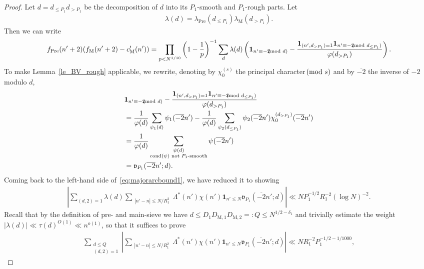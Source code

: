 \documentclass[12pt]{amsart}
\theoremstyle{definition}
\theoremstyle{remark}
\numberwithin{equation}{section}
\newcommand{\1}{\mathbf{1}}
\let\oldpmod\pmod
\renewcommand{\pmod}[1]{\hspace{-0.12cm}\oldpmod {#1}}
\begin{document}
\begin{proof}
  Let $d= d_{\le P_1}d_{>P_1}$ be the decomposition of $d$ into its $P_1$-smooth and $P_1$-rough parts. Let
  \begin{align*}
    \lambda(d)=\lambda_{\mathrm{Pre}}(d_{\leq P_1})\lambda_{\mathrm{M}}(d_{>P_1}).
  \end{align*}
Then we can write
  \begin{align*}
      f_{\mathrm{{Pre}}}(n'+2)(f_{\mathrm{{M}}}(n'+2)-c'_{\textup{M}}(n'))=\prod_{p<N^{1/10}}\left(1-\frac{1}{p}\right)^{-1}\sum_{d}\lambda(d)\left(\1_{n'\equiv -2\pmod d}-\frac{\1_{(n',d_{>P_1})=1}\1_{n'\equiv -2 \pmod{d_{\leq P_1}}}}{\varphi(d_{>P_1})}\right).
  \end{align*}
 To make Lemma~\ref{le_BV_rough} applicable, we rewrite, denoting by $\chi_{0}^{(s)}$ the principal character $\pmod{s}$ and by $\overline{-2}$ the inverse of $-2$ modulo $d$, 
\begin{align*}\nonumber 
&\1_{n'\equiv -2\pmod{d}}-\frac{\1_{(n',d_{>P_1})=1}\1_{n'\equiv -2 \pmod{d_{\leq P_1}}}}{\varphi(d_{>P_1})}\\
&=\nonumber\frac{1}{\varphi(d)}\sum_{\psi_1(d)}\psi_1(\overline{-2}n')-\frac{1}{\varphi(d)}\sum_{\psi_2(d_{\leq P_1})}\psi_2(\overline{-2}n')\chi_{0}^{(d_{>P_1})}(\overline{-2}n')\\
&=\nonumber \frac{1}{\varphi(d)}\sum_{\substack{\psi(d)\\ \text{cond}(\psi)\text{ not }P_1\text{-smooth}}}\psi(\overline{-2}n')\\
&=\nonumber \mathfrak{v}_{P_1}(\overline{-2}n';d).
\end{align*}
Coming back to the left-hand side of~\eqref{eq:majorarcbound1}, we have reduced it to showing
\begin{align}
\left|\sum_{(d,2)=1}\lambda(d)\sum_{\substack{|n'-n|\leq N/R_1^2\\}}\Lambda^*(n')\chi(n')\1_{n'\leq N}\mathfrak{v}_{P_1}(\overline{-2}n';d)\right| \ll N P_1^{-1/2} R_1^{-2} (\log N)^{-2}.
\end{align}
Recall that by the definition of pre- and main-sieve we have $d\leq D_1 D_{\mathrm{M},1}D_{\mathrm{M},2}=:Q\leq N^{1/2-\delta_1}$ and trivially estimate the weight $|\lambda(d)|\ll \tau(d)^{O(1)}\ll n^{o(1)}$, so that it suffices to prove 
\begin{align}\label{eq_prop1final_2}
\sum_{\substack{d\leq Q \\(d,2)=1}}\left|\sum_{\substack{|n'-n|\leq N/R_1^2\\}}\Lambda^*(n')\chi(n')\1_{n'\leq N}\mathfrak{v}_{P_1}(\overline{-2}n';d)\right| \ll NR_1^{-2} P_1^{-1/2-1/1000},

\end{align}
\end{proof}
\end{document}
